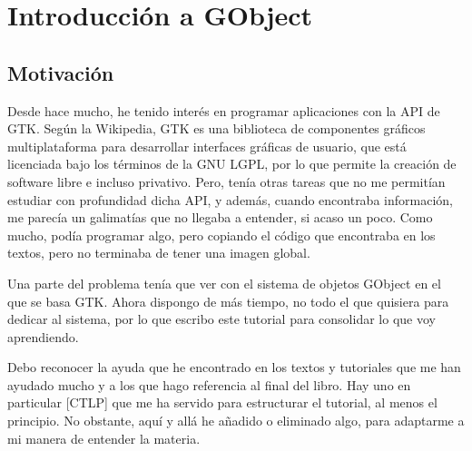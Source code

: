 %



\section{Introducción a \textsf{GObject}}

\subsection{Motivación} \label{subsec:motivacion}
Desde hace mucho, he tenido  interés en programar aplicaciones con la API de \textsf{GTK}.
Según la Wikipedia, \textsf{GTK} es una biblioteca de componentes gráficos multiplataforma para desarrollar
interfaces gráficas de usuario, que está licenciada bajo los términos de la GNU LGPL, por lo que permite la creación de software libre e incluso privativo.
Pero, tenía otras tareas que no me permitían estudiar con profundidad dicha API, y además, cuando encontraba información, me parecía un galimatías que no llegaba a entender, si acaso un poco.
Como mucho, podía programar algo, pero copiando el código que encontraba en los textos, pero no terminaba de tener una imagen global.

Una parte del problema tenía que ver con el sistema de objetos \textsf{GObject} en el que se basa \textsf{GTK}.
Ahora dispongo de más tiempo, no todo el que quisiera para dedicar al sistema, por lo que escribo este tutorial  para consolidar lo que voy aprendiendo.

Debo reconocer la ayuda que he encontrado en los textos y tutoriales que me han ayudado mucho y a los que hago referencia al final del libro. Hay uno en particular [CTLP] que me ha servido para estructurar el tutorial, al menos el principio. No obstante, aquí y allá he añadido o eliminado algo, para adaptarme a mi manera de entender la materia.

